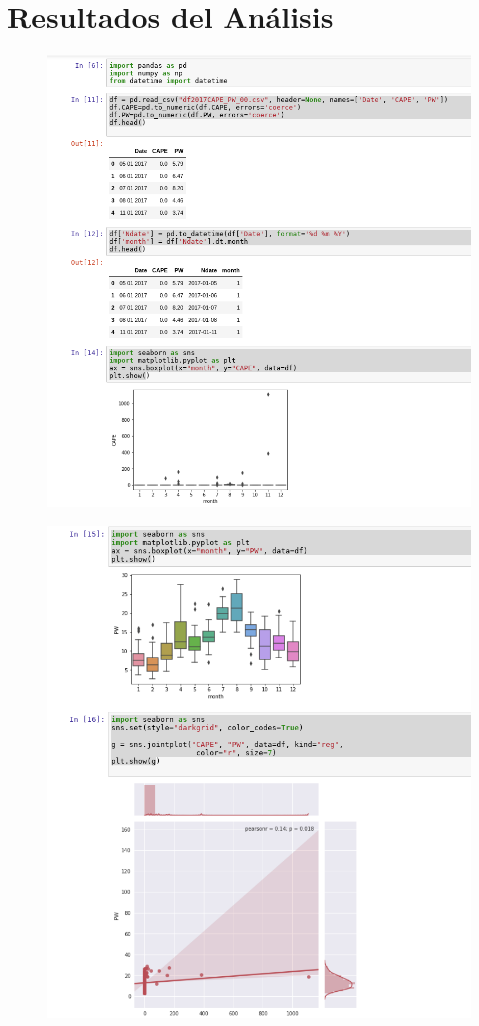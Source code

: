 \documentclass{article}
\begin{document}
\section{Resultados del Análisis}
\begin{figure}[H]
	\centering
    \includegraphics[width=\linewidth]{p1.png}
\end{figure}
\begin{figure}[H]
	\centering
    \includegraphics[width=\linewidth]{p2.png}
\end{figure}
\end{document}
